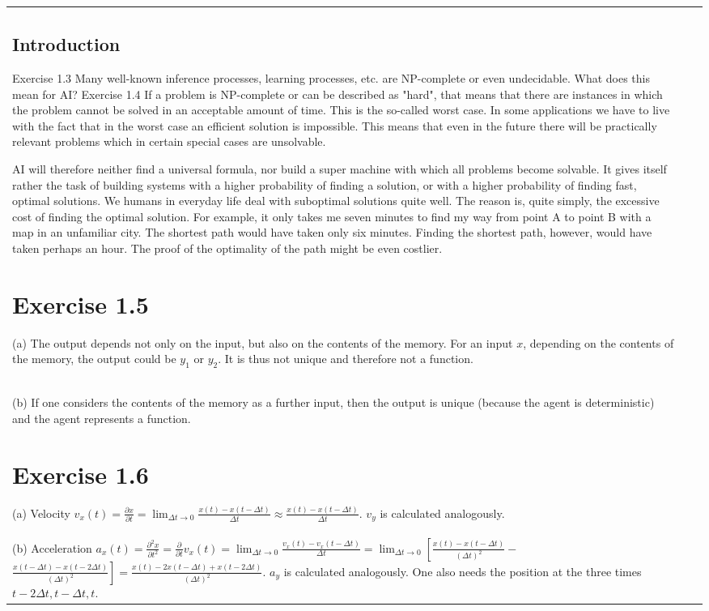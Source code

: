 \documentclass[10pt]{book}
\begin{document}
\begin{center}
\begin{tabular}{|l|l|l|}
\subsection{Introduction}
Exercise 1.3 Many well-known inference processes, learning processes, etc. are NP-complete or even undecidable. What does this mean for AI?
Exercise 1.4 If a problem is NP-complete or can be described as "hard", that means that there are instances in which the problem cannot be solved in an acceptable amount of time. This is the so-called worst case. In some applications we have to live with the fact that in the worst case an efficient solution is impossible. This means that even in the future there will be practically relevant problems which in certain special cases are unsolvable.

AI will therefore neither find a universal formula, nor build a super machine with which all problems become solvable. It gives itself rather the task of building systems with a higher probability of finding a solution, or with a higher probability of finding fast, optimal solutions. We humans in everyday life deal with suboptimal solutions quite well. The reason is, quite simply, the excessive cost of finding the optimal solution. For example, it only takes me seven minutes to find my way from point A to point B with a map in an unfamiliar city. The shortest path would have taken only six minutes. Finding the shortest path, however, would have taken perhaps an hour. The proof of the optimality of the path might be even costlier.

\section{Exercise 1.5}
(a) The output depends not only on the input, but also on the contents of the memory. For an input $x$, depending on the contents of the memory, the output could be $y_{1}$ or $y_{2}$. It is thus not unique and therefore not a function.\\
(b) If one considers the contents of the memory as a further input, then the output is unique (because the agent is deterministic) and the agent represents a function.

\section{Exercise 1.6}
(a) Velocity $v_{x}(t)=\frac{\partial x}{\partial t}=\lim _{\Delta t \rightarrow 0} \frac{x(t)-x(t-\Delta t)}{\Delta t} \approx \frac{x(t)-x(t-\Delta t)}{\Delta t}$. $v_{y}$ is calculated analogously.\\
(b) Acceleration $a_{x}(t)=\frac{\partial^{2} x}{\partial t^{2}}=\frac{\partial}{\partial t} v_{x}(t)=\lim _{\Delta t \rightarrow 0} \frac{v_{x}(t)-v_{x}(t-\Delta t)}{\Delta t}=\lim _{\Delta t \rightarrow 0}\left[\frac{x(t)-x(t-\Delta t)}{(\Delta t)^{2}}-\right.$ $\left.\frac{x(t-\Delta t)-x(t-2 \Delta t)}{(\Delta t)^{2}}\right]=\frac{x(t)-2 x(t-\Delta t)+x(t-2 \Delta t)}{(\Delta t)^{2}}$. $a_{y}$ is calculated analogously. One also needs the position at the three times $t-2 \Delta t, t-\Delta t, t$.


\end{tabular}
\end{center}
\end{document}
